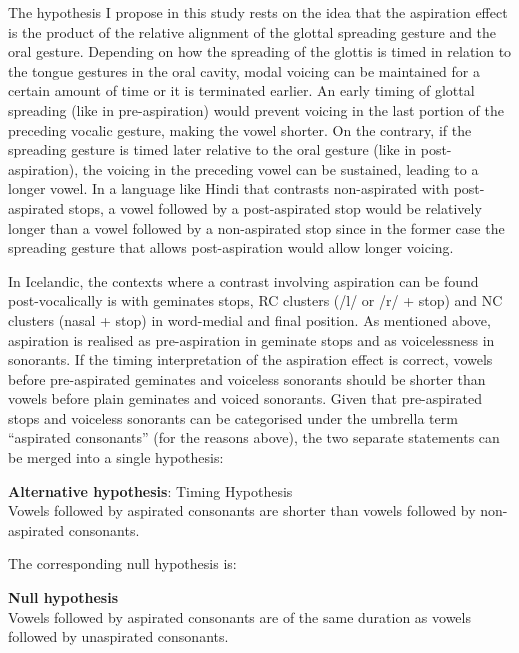 \documentclass[11pt,a4paper,oneside,openany]{memoir}\usepackage[]{graphicx}\usepackage[]{color}
\begin{document}
The hypothesis I propose in this study rests on the idea that the aspiration effect is the product of the relative alignment of the glottal spreading gesture and the oral gesture.
Depending on how the spreading of the glottis is timed in relation to the tongue gestures in the oral cavity, modal voicing can be maintained for a certain amount of time or it is terminated earlier.
An early timing of glottal spreading (like in pre-aspiration) would prevent voicing in the last portion of the preceding vocalic gesture, making the vowel shorter.
On the contrary, if the spreading gesture is timed later relative to the oral gesture (like in post-aspiration), the voicing in the preceding vowel can be sustained, leading to a longer vowel.
In a language like Hindi that contrasts non-aspirated with post-aspirated stops, a vowel followed by a post-aspirated stop would be relatively longer than a vowel followed by a non-aspirated stop since in the former case the spreading gesture that allows post-aspiration would allow longer voicing.

In Icelandic, the contexts where a contrast involving aspiration can be found post-vocalically is with geminates stops, RC clusters (/l/ or /r/ + stop) and NC clusters (nasal + stop) in word-medial and final position.
As mentioned above, aspiration is realised as pre-aspiration in geminate stops and as voicelessness in sonorants.
If the timing interpretation of the aspiration effect is correct, vowels before pre-aspirated geminates and voiceless sonorants should be shorter than vowels before plain geminates and voiced sonorants.
Given that pre-aspirated stops and voiceless sonorants can be categorised under the umbrella term ``aspirated consonants'' (for the reasons above), the two separate statements can be merged into a single hypothesis:

\begin{exe}
\ex\label{h1} \textbf{Alternative hypothesis}: Timing Hypothesis \\
Vowels followed by aspirated consonants are shorter than vowels followed by non-aspirated consonants.
\end{exe}

The corresponding null hypothesis is:

\begin{exe}
\ex\label{h0} \textbf{Null hypothesis} \\
Vowels followed by aspirated consonants are of the same duration as vowels followed by unaspirated consonants.
\end{exe}
\end{document}
